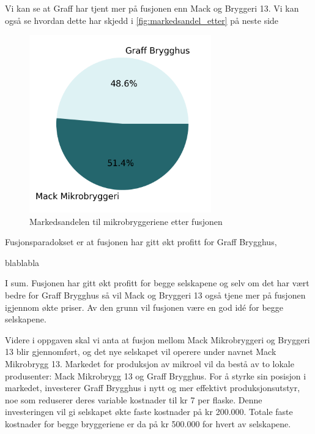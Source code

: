 \documentclass[
  12pt,
  a4paper,
  DIV=11,
  numbers=noendperiod]{scrartcl}
\begin{document}
Vi kan se at Graff har tjent mer på fusjonen enn Mack og Bryggeri 13. Vi
kan også se hvordan dette har skjedd i \autoref{fig:markedsandel_etter}
på neste side

\newpage

\begin{figure}[t]
\centering
\includegraphics[width=0.7\textwidth]{dokumentobjekter/figurer/markedsandel_mikrobryggerier_fusjon.png}
\caption{Markedsandelen til mikrobryggeriene etter fusjonen}
\label{fig:markedsandel_etter}
\end{figure}

Fusjonsparadokset er at fusjonen har gitt økt profitt for Graff
Brygghus,

blablabla

I sum. Fusjonen har gitt økt profitt for begge selskapene og selv om det
har vært bedre for Graff Brygghus så vil Mack og Bryggeri 13 også tjene
mer på fusjonen igjennom økte priser. Av den grunn vil fusjonen være en
god idé for begge selskapene.

\clearpage

Videre i oppgaven skal vi anta at fusjon mellom Mack Mikrobryggeri og
Bryggeri 13 blir gjennomført, og det nye selskapet vil operere under
navnet Mack Mikrobrygg 13. Markedet for produksjon av mikroøl vil da
bestå av to lokale produsenter: Mack Mikrobrygg 13 og Graff Brygghus.
For å styrke sin posisjon i markedet, investerer Graff Brygghus i nytt
og mer effektivt produksjonsutstyr, noe som reduserer deres variable
kostnader til kr 7 per flaske. Denne investeringen vil gi selskapet økte
faste kostnader på kr 200.000. Totale faste kostnader for begge
bryggeriene er da på kr 500.000 for hvert av selskapene.
\end{document}
